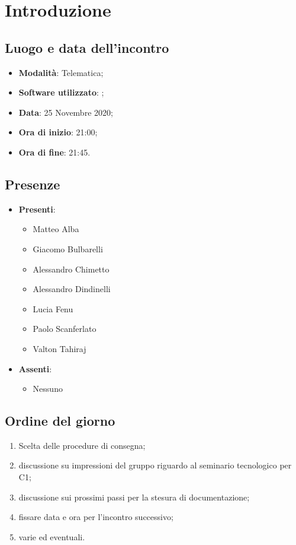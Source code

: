\documentclass[]{article}
\begin{document}
	
	
	\newpage
	
	\section{Introduzione}
		\subsection{Luogo e data dell'incontro}
		\begin{itemize}
			\item \textbf{Modalità}: Telematica;
			\item \textbf{Software utilizzato}: ;
			\item \textbf{Data}: 25 Novembre 2020;
			\item \textbf{Ora di inizio}: 21:00;
			\item \textbf{Ora di fine}: 21:45.
		\end{itemize}
		
		\subsection{Presenze}
		\begin{itemize}
			\item \textbf{Presenti}: 
			\begin{itemize}
				\item Matteo Alba
				\item Giacomo Bulbarelli
				\item Alessandro Chimetto
				\item Alessandro Dindinelli
				\item Lucia Fenu
				\item Paolo Scanferlato
				\item Valton Tahiraj
			\end{itemize}
			\item \textbf{Assenti}:
			\begin{itemize}
				\item Nessuno
			\end{itemize}
		\end{itemize}
		
		\subsection{Ordine del giorno}
		\begin{enumerate}
			\item Scelta delle procedure di consegna;
			\item discussione su impressioni del gruppo riguardo al seminario
			tecnologico per C1;
			\item discussione sui prossimi passi per la stesura di documentazione;
			\item fissare data e ora per l'incontro successivo;
			\item varie ed eventuali.
		\end{enumerate}
	
\end{document}
